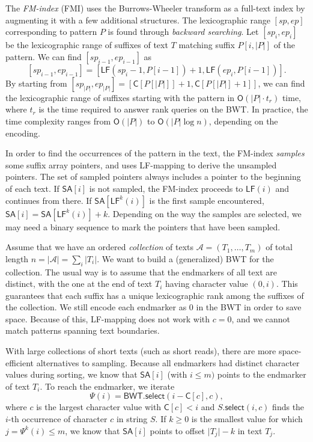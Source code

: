 \documentclass[smallabstract,smallcaptions]{dccpaper}
\newcommand{\abs}[1]{\ensuremath{\lvert #1 \rvert}}
\newcommand{\Oh}{\ensuremath{\mathsf{O}}}
\newcommand{\BWT}{\textsf{BWT}}
\newcommand{\FMI}{\textsf{FMI}}
\newcommand{\mSA}{\ensuremath{\mathsf{SA}}}
\newcommand{\mBWT}{\ensuremath{\mathsf{BWT}}}
\newcommand{\mC}{\ensuremath{\mathsf{C}}}
\newcommand{\LF}{\textsf{LF}}
\newcommand{\rank}{\textsf{rank}}
\newcommand{\mLF}{\ensuremath{\mathsf{LF}}}
\newcommand{\mselect}{\ensuremath{\mathsf{select}}}
\newcommand{\Acoll}{\ensuremath{\mathcal{A}}}
\begin{document}
The \emph{FM-index} (\FMI) \cite{Ferragina2005a} uses the Burrows-Wheeler transform as a full-text index by augmenting it with a few additional structures. The lexicographic range $[sp,ep]$ corresponding to pattern $P$ is found through \emph{backward searching}. Let $[sp_{i},ep_{i}]$ be the lexicographic range of suffixes of text $T$ matching suffix $P[i, \abs{P}]$ of the pattern. We can find $[sp_{i-1},ep_{i-1}]$ as
$$
[sp_{i-1},ep_{i-1}] = [\mLF(sp_{i}-1, P[i-1]) + 1, \mLF(ep_{i}, P[i-1])].
$$
By starting from $[sp_{\abs{P}}, ep_{\abs{P}}] = [\mC[P[\abs{P}]]+1, \mC[P[\abs{P}]+1]]$, we can find the lexicographic range of suffixes starting with the pattern in $\Oh(\abs{P} \cdot t_{r})$ time, where $t_{r}$ is the time required to answer \rank{} queries on the \BWT. In practice, the time complexity ranges from $\Oh(\abs{P})$ to $\Oh(\abs{P} \log n)$, depending on the encoding.

In order to find the occurrences of the pattern in the text, the FM-index \emph{samples} some suffix array pointers, and uses \LF\nobreakdash-mapping to derive the unsampled pointers. The set of sampled pointers always includes a pointer to the beginning of each text. If $\mSA[i]$ is not sampled, the FM-index proceeds to $\mLF(i)$ and continues from there. If $\mSA[\mLF^{k}(i)]$ is the first sample encountered, $\mSA[i] = \mSA[\mLF^{k}(i)] + k$. Depending on the way the samples are selected, we may need a binary sequence to mark the pointers that have been sampled.

Assume that we have an ordered \emph{collection} of texts $\Acoll = (T_{1}, \dotsc, T_{m})$ of total length $n = \abs{\Acoll} = \sum_{i} \abs{T_{i}}$. We want to build a (generalized) \BWT{} for the collection. The usual way is to assume that the endmarkers of all text are distinct, with the one at the end of text $T_{i}$ having character value $(0,i)$. This guarantees that each suffix has a unique lexicographic rank among the suffixes of the collection. We still encode each endmarker as $0$ in the \BWT{} in order to save space. Because of this, \LF\nobreakdash-mapping does not work with $c = 0$, and we cannot match patterns spanning text boundaries.

With large collections of short texts (such as short reads), there are more space-efficient alternatives to sampling. Because all endmarkers had distinct character values during sorting, we know that $\mSA[i]$ (with $i \le m)$ points to the endmarker of text $T_{i}$. To reach the endmarker, we iterate
$$
\Psi(i) = \mBWT.\mselect(i - \mC[c], c),
$$
where $c$ is the largest character value with $\mC[c] < i$ and $S.\mselect(i,c)$ finds the $i$\nobreakdash-th occurrence of character $c$ in string $S$. If $k \ge 0$ is the smallest value for which $j = \Psi^{k}(i) \le m$, we know that $\mSA[i]$ points to offset $\abs{T_{j}} - k$ in text $T_{j}$.
\end{document}

